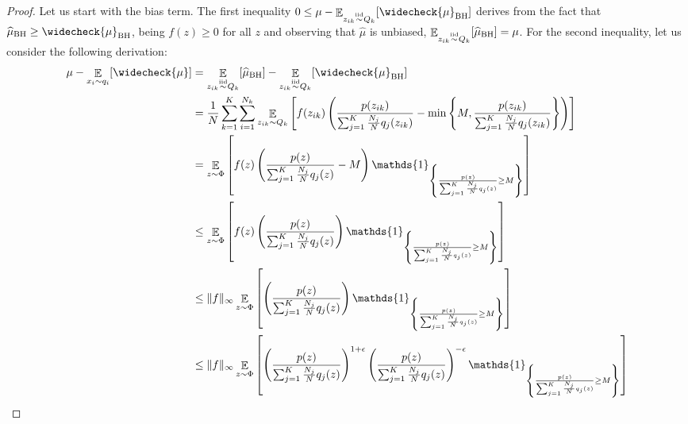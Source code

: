 \truncatedbias*
\begin{proof}
Let us start with the bias term. The first inequality $0 \le \mu - \Exp_{z_{ik} \simiid Q_k} [\widecheck{\mu}_{\text{BH}}]$ derives from the fact that $\widehat{\mu}_{\text{BH}} \ge \widecheck{\mu}_{\text{BH}}$, being $f(z) \ge 0$ for all $z$ and observing that $\widehat{\mu}$ is unbiased, \ie $\mathop{\mathbb{E}}_{z_{ik} \stackrel{\text{iid}}{\sim} Q_k}[\widehat{\mu}_{\text{BH}}]=\mu$. For the second inequality, let us consider the following derivation:
    \begin{align}
    \mu - \Exp_{x_i \sim q_i} [\widecheck{\mu}]&  = \Exp_{z_{ik} \simiid Q_k}[\widehat{\mu}_{\text{BH}}] - \Exp_{z_{ik} \simiid Q_k} [\widecheck{\mu}_{\text{BH}}] \notag \\
    & =  \frac{1}{N} \sum_{k=1}^K\sum_{i=1}^{N_k} \Exp_{z_{ik} \sim Q_k} \left[  f(z_{ik}) \left( \frac{p(z_{ik})}{\sum_{j=1}^K \frac{N_j}{N} q_j(z_{ik})} - \min \left\{ M,  \frac{p(z_{ik})}{\sum_{j=1}^K \frac{N_j}{N} q_j(z_{ik})} \right\} \right) \right]\\    
    & =  \Exp_{z \sim \Phi} \left[  f(z) \left(  \frac{p(z)}{\sum_{j=1}^K \frac{N_j}{N} q_j(z)} - M  \right) \mathds{1}_{\left\{ \frac{p(z)}{\sum_{j=1}^K \frac{N_j}{N} q_j(z)} \ge M \right\} } \right] \label{p:truncatedbias1}\\
    & \le \Exp_{z \sim \Phi} \left[  f(z) \left(  \frac{p(z)}{\sum_{j=1}^K \frac{N_j}{N} q_j(z)} \right) \mathds{1}_{\left\{ \frac{p(z)}{\sum_{j=1}^K \frac{N_j}{N} q_j(z)} \ge M \right\} } \right] \label{p:truncatedbias2}\\
    & \le \|f\|_{\infty} \Exp_{z \sim \Phi} \left[  \left(  \frac{p(z)}{\sum_{j=1}^K \frac{N_j}{N} q_j(z)} \right) \mathds{1}_{\left\{ \frac{p(z)}{\sum_{j=1}^K \frac{N_j}{N} q_j(z)} \ge M \right\} } \right] \notag\\
    & \le \|f\|_{\infty} \Exp_{z \sim \Phi} \left[  \left(  \frac{p(z)}{\sum_{j=1}^K \frac{N_j}{N} q_j(z)} \right)^{1+\epsilon} \left(  \frac{p(z)}{\sum_{j=1}^K \frac{N_j}{N} q_j(z)} \right)^{-\epsilon} \mathds{1}_{\left\{ \frac{p(z)}{\sum_{j=1}^K \frac{N_j}{N} q_j(z)} \ge M \right\} } \right] \notag\\

\end{align}
\end{proof}
